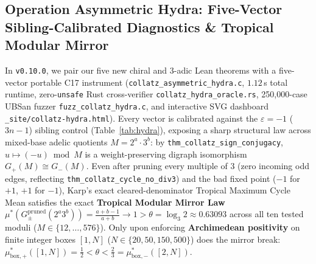 \documentclass[11pt,reqno]{amsart}
\theoremstyle{plain}
\theoremstyle{definition}
\newcommand{\code}[1]{{\upshape\nolinkurl{#1}}}
\begin{document}
\subsection{Operation Asymmetric Hydra: Five-Vector Sibling-Calibrated Diagnostics \& Tropical Modular Mirror}\label{sec:hydra}
In \texttt{v0.10.0}, we pair our five new chiral and 3-adic Lean theorems with a five-vector
portable C17 instrument (\code{collatz_asymmetric_hydra.c}, $1.12$\,s total runtime, zero-\code{unsafe}
Rust cross-verifier \code{collatz_hydra_oracle.rs}, 250,000-case UBSan fuzzer
\code{fuzz_collatz_hydra.c}, and interactive SVG dashboard \code{_site/collatz-hydra.html}).
Every vector is calibrated against the $\varepsilon=-1$ ($3n-1$) sibling control
(Table~\ref{tab:hydra}), exposing a sharp structural law across mixed-base adelic quotients
$M = 2^a \cdot 3^b$: by \code{thm_collatz_sign_conjugacy}, $u \mapsto (-u) \bmod M$ is a
weight-preserving digraph isomorphism $G_+(M) \cong G_-(M)$. Even after pruning every multiple of
$3$ (zero incoming odd edges, reflecting \code{thm_collatz_cycle_no_div3}) and the bad fixed point
($-1$ for $+1$, $+1$ for $-1$), Karp's exact cleared-denominator Tropical Maximum Cycle Mean
satisfies the exact \textbf{Tropical Modular Mirror Law}
$\mu^*(G_\pm^{\text{pruned}}(2^a 3^b)) = \frac{a+b-1}{a+b} \to 1 > \theta = \log_3 2 \approx 0.63093$
across all ten tested moduli ($M \in \{12,\dots,576\}$). Only upon enforcing \textbf{Archimedean
positivity} on finite integer boxes $[1, N]$ ($N \in \{20, 50, 150, 500\}$) does the mirror break:
$\mu^*_{\text{box},+}([1,N]) = \frac{1}{2} < \theta < \frac{2}{3} = \mu^*_{\text{box},-}([2,N])$.
\end{document}
